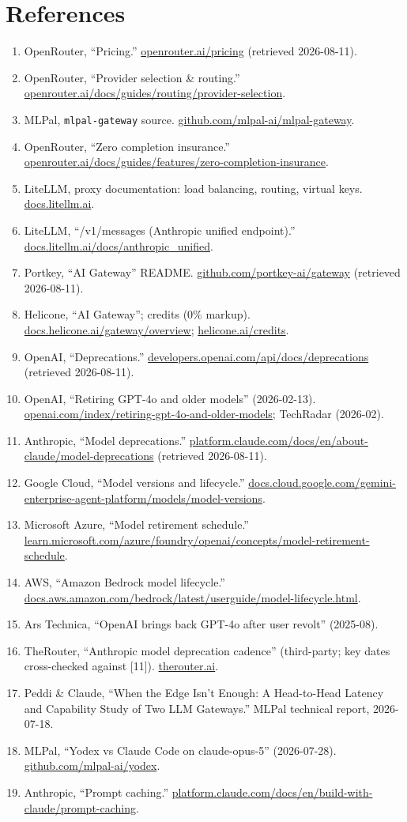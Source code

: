 \documentclass[10pt]{article}
\begin{document}
\section*{References}
\begingroup\small
\begin{enumerate}\itemsep1pt
\item OpenRouter, ``Pricing.'' \url{openrouter.ai/pricing} (retrieved 2026-08-11).
\item OpenRouter, ``Provider selection \& routing.'' \url{openrouter.ai/docs/guides/routing/provider-selection}.
\item MLPal, \texttt{mlpal-gateway} source. \url{github.com/mlpal-ai/mlpal-gateway}.
\item OpenRouter, ``Zero completion insurance.'' \url{openrouter.ai/docs/guides/features/zero-completion-insurance}.
\item LiteLLM, proxy documentation: load balancing, routing, virtual keys. \url{docs.litellm.ai}.
\item LiteLLM, ``/v1/messages (Anthropic unified endpoint).'' \url{docs.litellm.ai/docs/anthropic_unified}.
\item Portkey, ``AI Gateway'' README. \url{github.com/portkey-ai/gateway} (retrieved 2026-08-11).
\item Helicone, ``AI Gateway''; credits (0\% markup). \url{docs.helicone.ai/gateway/overview}; \url{helicone.ai/credits}.
\item OpenAI, ``Deprecations.'' \url{developers.openai.com/api/docs/deprecations} (retrieved 2026-08-11).
\item OpenAI, ``Retiring GPT-4o and older models'' (2026-02-13). \url{openai.com/index/retiring-gpt-4o-and-older-models}; TechRadar (2026-02).
\item Anthropic, ``Model deprecations.'' \url{platform.claude.com/docs/en/about-claude/model-deprecations} (retrieved 2026-08-11).
\item Google Cloud, ``Model versions and lifecycle.'' \url{docs.cloud.google.com/gemini-enterprise-agent-platform/models/model-versions}.
\item Microsoft Azure, ``Model retirement schedule.'' \url{learn.microsoft.com/azure/foundry/openai/concepts/model-retirement-schedule}.
\item AWS, ``Amazon Bedrock model lifecycle.'' \url{docs.aws.amazon.com/bedrock/latest/userguide/model-lifecycle.html}.
\item Ars Technica, ``OpenAI brings back GPT-4o after user revolt'' (2025-08).
\item TheRouter, ``Anthropic model deprecation cadence'' (third-party; key dates cross-checked against [11]). \url{therouter.ai}.
\item Peddi \& Claude, ``When the Edge Isn't Enough: A Head-to-Head Latency and Capability Study of Two LLM Gateways.'' MLPal technical report, 2026-07-18.
\item MLPal, ``Yodex vs Claude Code on claude-opus-5'' (2026-07-28). \url{github.com/mlpal-ai/yodex}.
\item Anthropic, ``Prompt caching.'' \url{platform.claude.com/docs/en/build-with-claude/prompt-caching}.
\end{enumerate}
\endgroup
\end{document}
